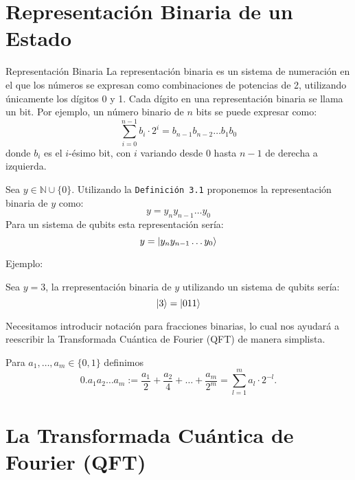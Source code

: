 \documentclass{article}
\begin{document}
\section{Representación Binaria de un Estado}
\begin{mydef}{Representación Binaria}{}
La representación binaria es un sistema de numeración en el que los números se expresan como combinaciones de potencias de 2, utilizando únicamente los dígitos 0 y 1. Cada dígito en una representación binaria se llama un bit. Por ejemplo, un número binario de \( n \) bits se puede expresar como:
\[
 \sum_{i=0}^{n-1} b_i \cdot 2^i = b_{n-1}b_{n-2}\ldots b_1b_0 
\]
donde \( b_i \) es el \( i \)-ésimo bit, con \( i \) variando desde 0 hasta \( n-1 \) de derecha a izquierda.
\end{mydef}
Sea \(y\in \mathbb{N}\cup\{0\}\). Utilizando la \texttt{Definición 3.1} proponemos la representación binaria
de \(y\) como: 
\[y= y_{n}y_{n-1}\ldots y_{0}\]
Para un sistema de qubits esta representación sería:
\[y= \ket{y_{n}y_{n-1}\ldots y_{0}}\]
\begin{mdframed}[backgroundcolor=blue!10, linewidth=1pt, linecolor=blue]
    Ejemplo:

    Sea \(y= 3\), la rrepresentación binaria de \(y\) utilizando un sistema de qubits sería:
    \[\ket{3} = \ket{011}\]
\end{mdframed}

Necesitamos introducir notación para fracciones binarias,
lo cual nos ayudará a reescribir la Transformada Cuántica de Fourier (QFT)
de manera simplista.
\begin{mydef}{}{}
    Para $a_1, \ldots, a_m \in \{0, 1\}$ definimos
\[
0.a_1a_2 \ldots a_m := \frac{a_1}{2} + \frac{a_2}{4} + \ldots + \frac{a_m}{2^m} =
\sum_{l=1}^{m} a_l \cdot 2^{-l}.
\]
\end{mydef}
\section{La Transformada Cuántica de Fourier (QFT)}
\end{document}
